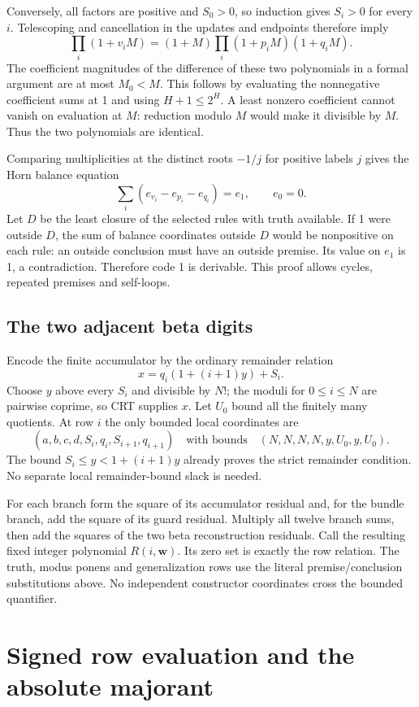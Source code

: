 \documentclass[11pt]{article}
\theoremstyle{definition}
\theoremstyle{remark}
\begin{document}
Conversely, all factors are positive and $S_0>0$, so induction gives
$S_i>0$ for every $i$. Telescoping and cancellation in the updates
and endpoints therefore imply
\[
 \prod_i(1+v_iM)=(1+M)\prod_i(1+p_iM)(1+q_iM).
\]
The coefficient magnitudes of the difference of these two polynomials
in a formal argument are at most $M_0<M$. This follows by evaluating
the nonnegative coefficient sums at 1 and using $H+1\le2^H$.
A least nonzero coefficient cannot vanish on evaluation at $M$:
reduction modulo $M$ would make it divisible by $M$. Thus the two
polynomials are identical.

Comparing multiplicities at the distinct roots $-1/j$ for positive labels
$j$ gives the Horn balance equation
\[
 \sum_i(e_{v_i}-e_{p_i}-e_{q_i})=e_1,\qquad e_0=0.
\]
Let $D$ be the least closure of the selected rules with truth available.
If 1 were outside $D$, the sum of balance coordinates outside $D$ would
be nonpositive on each rule: an outside conclusion must have an outside
premise. Its value on $e_1$ is 1, a contradiction. Therefore code 1 is
derivable. This proof allows cycles, repeated premises and self-loops.

\subsection{The two adjacent beta digits}
Encode the finite accumulator by the ordinary remainder relation
\[
 x=q_i(1+(i+1)y)+S_i.
\]
Choose $y$ above every $S_i$ and divisible by $N!$; the moduli for
$0\le i\le N$ are pairwise coprime, so CRT supplies $x$.
Let $U_0$ bound all the finitely many quotients.
At row $i$ the only bounded local coordinates are
\[
 (a,b,c,d,S_i,q_i,S_{i+1},q_{i+1})
 \quad\text{with bounds}\quad (N,N,N,N,y,U_0,y,U_0).
\]
The bound $S_i\le y<1+(i+1)y$ already proves the strict remainder
condition. No separate local remainder-bound slack is needed.

For each branch form the square of its accumulator residual and, for the
bundle branch, add the square of its guard residual. Multiply all twelve
branch sums, then add the squares of the two beta reconstruction
residuals. Call the resulting fixed integer polynomial $R(i,\mathbf w)$.
Its zero set is exactly the row relation. The truth, modus ponens and
generalization rows use the literal premise/conclusion substitutions
above. No independent constructor coordinates cross the bounded quantifier.

\section{Signed row evaluation and the absolute majorant}
\end{document}
